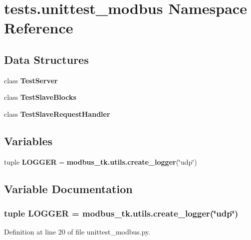 \section{tests.\+unittest\+\_\+modbus Namespace Reference}
\label{namespacetests_1_1unittest__modbus}
\subsection*{Data Structures}
\begin{DoxyCompactItemize}
\item 
class {\bf Test\+Server}
\item 
class {\bf Test\+Slave\+Blocks}
\item 
class {\bf Test\+Slave\+Request\+Handler}
\end{DoxyCompactItemize}
\subsection*{Variables}
\begin{DoxyCompactItemize}
\item 
tuple {\bf L\+O\+G\+G\+E\+R} = {\bf modbus\+\_\+tk.\+utils.\+create\+\_\+logger}(\char`\"{}udp\char`\"{})
\end{DoxyCompactItemize}


\subsection{Variable Documentation}
\subsubsection[{L\+O\+G\+G\+E\+R}]{\setlength{\rightskip}{0pt plus 5cm}tuple L\+O\+G\+G\+E\+R = {\bf modbus\+\_\+tk.\+utils.\+create\+\_\+logger}(\char`\"{}udp\char`\"{})}\label{namespacetests_1_1unittest__modbus_ae9c29667350ae00a0837fc1e77c279e2}


Definition at line 20 of file unittest\+\_\+modbus.\+py.

